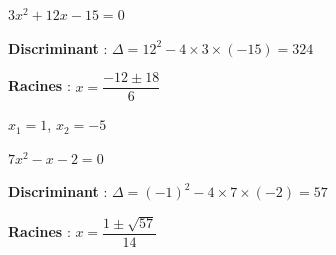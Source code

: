\documentclass[11pt,a4paper]{article}  %
\begin{document}
\begin{enumMet}
	\item $3 x^2+12 x-15=0$
	\begin{corrBox}
		\begin{itemMet}
			\item \textbf{Discriminant} : \( \Delta = 12^2 - 4 \times 3 \times (-15) = 324 \)
			\item \textbf{Racines} : \( x = \dfrac{-12 \pm 18}{6} \)
			\item \( x_1 = 1 \), \( x_2 = -5 \)
		\end{itemMet}		
	\end{corrBox}
	\item $7 x^2-x-2=0$
	\begin{corrBox}
		\begin{itemMet}
			\item \textbf{Discriminant} : \( \Delta = (-1)^2 - 4 \times 7 \times (-2) = 57 \)
			\item \textbf{Racines} : \( x = \dfrac{1 \pm \sqrt{57}}{14} \)
		\end{itemMet}		
	\end{corrBox}
\end{enumMet}
\end{document}
